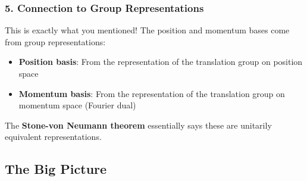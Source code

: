 \documentclass[aps,prl,reprint]{revtex4-2}
\begin{document}
\subsubsection*{5. Connection to Group Representations}

This is exactly what you mentioned! The position and momentum bases come
from group representations:

\begin{itemize}
\item \textbf{Position basis}: From the representation of the translation
group on position space

\item \textbf{Momentum basis}: From the representation of the translation
group on momentum space (Fourier dual)
\end{itemize}

The \textbf{Stone-von Neumann theorem} essentially says these are unitarily
equivalent representations.

\subsection*{The Big Picture}
\end{document}
